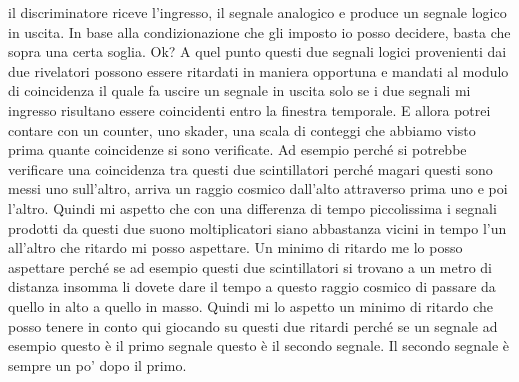 {il discriminatore riceve l'ingresso, il segnale analogico e produce un segnale logico in uscita. In base alla condizionazione che gli imposto io posso decidere, basta che sopra una certa soglia. Ok? A quel punto questi due segnali logici provenienti dai due rivelatori possono essere ritardati in maniera opportuna e mandati al modulo di coincidenza il quale fa uscire un segnale in uscita solo se i due segnali mi ingresso risultano essere coincidenti entro la finestra temporale. E allora potrei contare con un counter, uno skader, una scala di conteggi che abbiamo visto prima quante coincidenze si sono verificate. Ad esempio perché si potrebbe verificare una coincidenza tra questi due scintillatori perché magari questi sono messi uno sull'altro, arriva un raggio cosmico dall'alto attraverso prima uno e poi l'altro. Quindi mi aspetto che con una differenza di tempo piccolissima i segnali prodotti da questi due suono moltiplicatori siano abbastanza vicini in tempo l'un all'altro che ritardo mi posso aspettare. Un minimo di ritardo me lo posso aspettare perché se ad esempio questi due scintillatori si trovano a un metro di distanza insomma li dovete dare il tempo a questo raggio cosmico di passare da quello in alto a quello in masso. Quindi mi lo aspetto un minimo di ritardo che posso tenere in conto qui giocando su questi due ritardi perché se un segnale ad esempio questo è il primo segnale questo è il secondo segnale. Il secondo segnale è sempre un po' dopo il primo.

}
